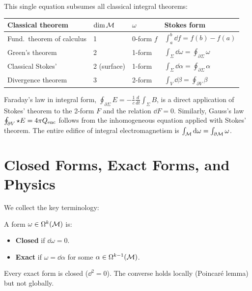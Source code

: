 This single equation subsumes all classical integral theorems:

\begin{table}[h]
\centering
\renewcommand{\arraystretch}{1.4}
\begin{tabular}{llll}
\toprule
\textbf{Classical theorem} & $\dim\mathcal{M}$ & $\omega$ & \textbf{Stokes form} \\
\midrule
Fund.\ theorem of calculus & 1 & 0-form $f$ & $\int_a^b \dd f = f(b) - f(a)$ \\
Green's theorem & 2 & 1-form & $\int_\Sigma \dd\omega = \oint_{\partial\Sigma}\omega$ \\
Classical Stokes' & 2 (surface) & 1-form & $\int_\Sigma \dd\alpha = \oint_{\partial\Sigma}\alpha$ \\
Divergence theorem & 3 & 2-form & $\int_V \dd\beta = \oint_{\partial V}\beta$ \\
\bottomrule
\end{tabular}
\end{table}

\begin{remark}
Faraday's law in integral form, $\oint_{\partial\Sigma} E = -\frac{1}{c}\frac{d}{dt}\int_\Sigma B$, is a direct application of Stokes' theorem to the 2-form $F$ and the relation $\dd F = 0$. Similarly, Gauss's law $\oint_{\partial V} \star E = 4\pi Q_{\text{enc}}$ follows from the inhomogeneous equation applied with Stokes' theorem. The entire edifice of integral electromagnetism is $\int_{\mathcal{M}}\mathrm{d}\omega = \int_{\partial\mathcal{M}}\omega$.
\end{remark}

\section{Closed Forms, Exact Forms, and Physics}

We collect the key terminology:

\begin{definition}
A form $\omega \in \Omega^k(\mathcal{M})$ is:
\begin{itemize}
\item \textbf{Closed} if $\dd\omega = 0$.
\item \textbf{Exact} if $\omega = \dd\alpha$ for some $\alpha \in \Omega^{k-1}(\mathcal{M})$.
\end{itemize}
Every exact form is closed ($\dd^2 = 0$). The converse holds locally (Poincar\'e lemma) but not globally.
\end{definition}

